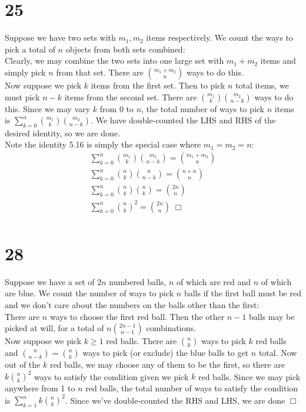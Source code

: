 \documentclass{article}
\begin{document}
\section*{25}
Suppose we have two sets with $m_1, m_2$ items respectively. We count the ways to pick a total of $n$ objects from both sets combined:\\
Clearly, we may combine the two sets into one large set with $m_1 + m_2$ items and simply pick $n$ from that set. There are $\binom{m_1 + m_2}{n}$ ways to do this.\\
Now suppose we pick $k$ items from the first set. Then to pick $n$ total items, we must pick $n-k$ items from the second set. There are $\binom{m_1}{k} \binom{m_2}{n-k}$ ways to do this. Since we may vary $k$ from 0 to $n$, the total number of ways to pick $n$ items is $\sum\limits_{k=0}^n \binom{m_1}{k}\binom{m_2}{n-k}$. We have double-counted the LHS and RHS of the desired identity, so we are done.\\
Note the identity 5.16 is simply the special case where $m_1 = m_2 = n$:
\begin{gather*}
\sum\limits_{k=0}^n \binom{m_1}{k}\binom{m_2}{n-k} = \binom{m_1 + m_2}{n}\\
\sum\limits_{k=0}^n \binom{n}{k} \binom{n}{n-k} = \binom{n + n}{n}\\
\sum\limits_{k=0}^n \binom{n}{k} \binom{n}{k} = \binom{2n}{n}\\
\sum\limits_{k=0}^n \binom{n}{k}^2 = \binom{2n}{n} \; \Box\\
\end{gather*}

\section*{28}
Suppose we have a set of $2n$ numbered balls, $n$ of which are red and $n$ of which are blue. We count the number of ways to pick $n$ balls if the first ball must be red and we don't care about the numbers on the balls other than the first:\\
There are $n$ ways to choose the first red ball. Then the other $n-1$ balls may be picked at will, for a total of $n \binom{2n-1}{n-1}$ combinations.\\
Now suppose we pick $k \geqslant 1$ red balls. There are $\binom{n}{k}$ ways to pick $k$ red balls and $\binom{n}{n-k} = \binom{n}{k}$ ways to pick (or exclude) the blue balls to get $n$ total. Now out of the $k$ red balls, we may choose any of them to be the first, so there are $k \binom{n}{k}^2$ ways to satisfy the condition given we pick $k$ red balls. Since we may pick anywhere from 1 to $n$ red balls, the total number of ways to satisfy the condition is $\sum\limits_{k=1}^n k\binom{n}{k}^2$. Since we've double-counted the RHS and LHS, we are done $\Box$
\end{document}
